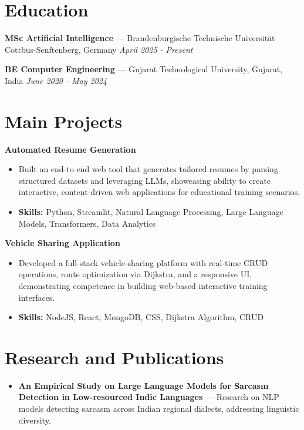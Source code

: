 \documentclass[a4paper,10pt]{article}
\begin{document}
\section*{Education}
\textbf{MSc Artificial Intelligence} — Brandenburgische Technische Universität Cottbus-Senftenberg, Germany \hfill \textit{April 2025 - Present}\par
\vspace{1.5pt}
\textbf{BE Computer Engineering} — Gujarat Technological University, Gujarat, India \hfill \textit{June 2020 - May 2024}\par

\section*{Main Projects}
\textbf{Automated Resume Generation}\par
\vspace{1pt}
\begin{itemize}
  \item Built an end-to-end web tool that generates tailored resumes by parsing structured datasets and leveraging LLMs, showcasing ability to create interactive, content-driven web applications for educational training scenarios.
  \item \textbf{Skills:} Python, Streamlit, Natural Language Processing, Large Language Models, Transformers, Data Analytics
\end{itemize}
\vspace{3pt}
\textbf{Vehicle Sharing Application}\par
\vspace{1pt}
\begin{itemize}
  \item Developed a full-stack vehicle-sharing platform with real-time CRUD operations, route optimization via Dijkstra, and a responsive UI, demonstrating competence in building web-based interactive training interfaces.
  \item \textbf{Skills:} NodeJS, React, MongoDB, CSS, Dijkstra Algorithm, CRUD
\end{itemize}

\section*{Research and Publications}
\begin{itemize}
\item \textbf{An Empirical Study on Large Language Models for Sarcasm Detection in Low-resourced Indic Languages} — Research on NLP models detecting sarcasm across Indian regional dialects, addressing linguistic diversity.
\end{itemize}
\end{document}
